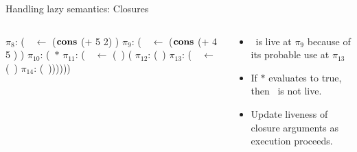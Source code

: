 \documentclass[xcolor=x11names,compress,mathserif]{beamer}
\renewcommand{\(}{\begin{columns}}
\renewcommand{\)}{\end{columns}}
\newcommand{\<}[1]{\begin{column}{#1}}
\renewcommand{\>}{\end{column}}
\begin{document}
\begin{frame}{Handling lazy semantics: Closures}
\begin{columns}[c]
    \begin{column}[T]{0.5\textwidth}
      \hspace*{-.3cm}\renewcommand{\arraystretch}{1}{
        \begin{uprogram}
          \hspace*{-.4cm} $\pi_8\!\!:\, $(\LET\  \px\  $\leftarrow$ ($\mbox{$\mathbf{cons}$}$ ($+$ 5 2) \NIL)  \IN
             \hspace*{-.3cm}   $\pi_9\!\!:\, $(\LET\ \pz\ $\leftarrow$ ($\mbox{$\mathbf{cons}$}$ ($+$ 4 5 ) \px) \IN
             \hspace*{-.3cm}   $\pi_{10}\!\!:\, $(\SIF\ $*$
             \hspace*{-.35cm} $\pi_{11}\!\!:\, $(\LET\ \pw\  $\leftarrow$ (\plength\ \pz) (\IN
             \hspace*{-.38cm}  $\pi_{12}\!\!:\, $(\RETURN\ \pw)
             \hspace*{-.35cm}  $\pi_{13}\!\!:\, $(\LET\ \pb\  $\leftarrow$ (\pfun\  \pz) \IN
             \hspace*{-.38cm} $\pi_{14}\!\!:\,$(\RETURN\ \pb))))))
   \end{uprogram}}
    \end{column}
    \begin{column}[T]{0.5\textwidth}
      \begin{itemize}
      \item \px\ is live at $\pi_{9}$  because of its probable use at $\pi_{13}$
      \item If $*$ evaluates to true, then \px\ is not live.
      \item Update liveness of closure arguments as execution proceeds.
      \end{itemize}
    \end{column}
  \end{columns}  
\end{frame}
\end{document}
